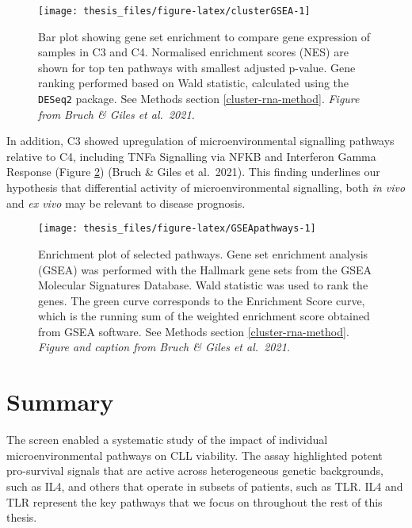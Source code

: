 \documentclass[11pt, a4paper, twosided]{book}
\begin{document}
\begin{figure}

{\centering \texttt{[image: thesis\_files/figure-latex/clusterGSEA-1]} 

}

\caption{Bar plot showing gene set enrichment to compare gene expression of samples in C3 and C4. Normalised enrichment scores (NES) are shown for top ten pathways with smallest adjusted p-value. Gene ranking performed based on Wald statistic, calculated using the \texttt{DESeq2} package. See Methods section \ref{cluster-rna-method}. \emph{Figure from Bruch \& Giles et al.~2021. }}\label{fig:clusterGSEA}
\end{figure}
In addition, C3 showed upregulation of microenvironmental signalling pathways relative to C4, including TNFa Signalling via NFKB and Interferon Gamma Response (Figure \ref{fig:GSEApathways}) (Bruch \& Giles et al.~2021). This finding underlines our hypothesis that differential activity of microenvironmental signalling, both \emph{in vivo} and \emph{ex vivo} may be relevant to disease prognosis.


\begin{figure}

{\centering \texttt{[image: thesis\_files/figure-latex/GSEApathways-1]} 

}

\caption{Enrichment plot of selected pathways. Gene set enrichment analysis (GSEA) was performed with the Hallmark gene sets from the GSEA Molecular Signatures Database. Wald statistic was used to rank the genes. The green curve corresponds to the Enrichment Score curve, which is the running sum of the weighted enrichment score obtained from GSEA software. See Methods section \ref{cluster-rna-method}. \emph{Figure and caption from Bruch \& Giles et al.~2021.}}\label{fig:GSEApathways}
\end{figure}
\hypertarget{summary}{%
\section{Summary}\label{summary}}

The screen enabled a systematic study of the impact of individual microenvironmental pathways on CLL viability. The assay highlighted potent pro-survival signals that are active across heterogeneous genetic backgrounds, such as IL4, and others that operate in subsets of patients, such as TLR. IL4 and TLR represent the key pathways that we focus on throughout the rest of this thesis.
\end{document}
